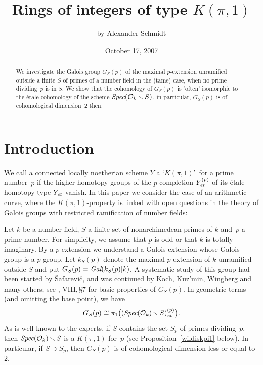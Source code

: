 \documentclass[10pt]{article}
\title{\bf\boldmath Rings of integers of type $K(\pi,1)$}
\author{by Alexander Schmidt}
\date{October 17, 2007}
\newcommand{\Spec}{\text{\it Spec}}
\renewcommand{\O}{{\mathcal{O}}}
\newcommand{\sm}{{\,\smallsetminus\,}}
\newcommand{\et}{\text{\it et}}
\newcommand{\Gal}{\text{\it Gal}}
\theoremstyle{alex}
\theoremstyle{alexdef}
\begin{document}
\maketitle

\begin{abstract} We investigate the Galois group $G_S(p)$ of the maximal $p$-extension unramified outside a finite $S$ of primes of a number field in the (tame) case, when no prime dividing~$p$ is in $S$. We show that the cohomology of $G_S(p)$ is `often' isomorphic to the \'{e}tale cohomology of the scheme $\Spec(\O_k \sm S)$, in particular, $G_S(p)$ is of cohomological dimension~$2$ then.
\end{abstract}


\section{Introduction}
We call a connected locally noetherian scheme $Y$ a \lq $K(\pi,1)$\rq\ for a prime number~$p$ if the higher homotopy groups of the $p$-completion $Y_\et^{(p)}$ of its \'{e}tale homotopy type $Y_\et$ vanish.  In this paper we consider the case of an arithmetic curve, where the $K(\pi,1)$-property is linked with open questions in the theory of Galois groups with restricted ramification of number fields:



\smallskip
Let $k$ be a number field, $S$ a finite set of nonarchimedean primes of $k$ and~$p$\/ a prime number.  For simplicity, we assume that $p$ is odd or that $k$ is totally imaginary. By a $p$-extension we understand a Galois extension whose Galois group is a  $p$-group. Let $k_S(p)$ denote the maximal $p$-extension of $k$ unramified outside $S$ and  put $G_S(p)=\Gal(k_S(p)|k)$.
A systematic study of this group had been started by \v Safarevi\v c, and was continued by  Koch, Kuz'min, Wingberg and many others;  see \cite{NSW}, VIII,\,\S 7 for basic properties of $G_S(p)$. In geometric terms (and omitting the base point), we have
\[
G_S(p)\cong \pi_1\big((\Spec(\O_k)\sm S)_\et^{(p)}\big).
\]
As is well known to the experts, if $S$ contains the set $S_p$ of primes dividing~$p$, then $\Spec(\O_k)\sm S$ is a $K(\pi,1)$ for~$p$ (see Proposition~\ref{wildiskpi1} below). In particular, if $S\supset S_p$, then $G_S(p)$ is of cohomological dimension less or equal to $2$.
\end{document}
